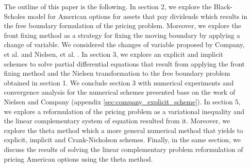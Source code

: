 The outline of this paper is the following. In section 2, we explore the  Black-Scholes model for American options for assets that pay dividends which results in the free boundary formulation of the pricing problem. Moreover, we explore the front fixing method as a strategy for fixing the moving boundary by applying a change of variable. We considered the changes of variable proposed by Company, et al. \cite*{company_egorova_jodar_2014} and Nielsen, et al. \cite*{nielsen_2001}. In section 3, we explore an explicit and implicit schemes to solve partial differential equations that  result from applying the front fixing method and the Nielsen transformation to the free boundary problem obtained in section 1. We conclude section 3 with numerical experiments and convergence analysis for the numerical schemes presented base on the work of Nielsen and Company (appendix \ref{sec:company_explicit_scheme}). In section 5, we explore a reformulation of the pricing problem as a variational inequality and the linear complementary system of equation resulted from it. Moreover, we explore the theta method which a more general numerical method that yields to explicit, implicit and Crank-Nicholson schemes. Finally, in the same section, we discuss the results of solving the linear complementary problem reformulation of pricing American options using the theta method.

